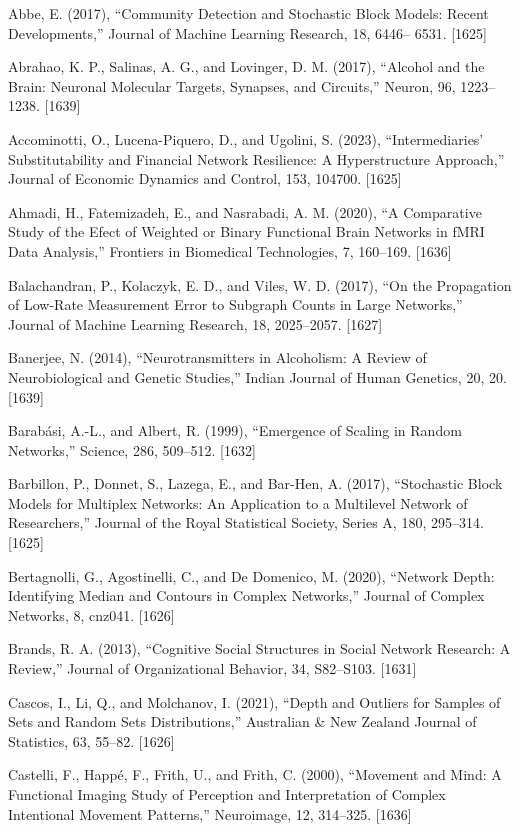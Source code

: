 \documentclass[
  10
]{article}
\begin{document}
Abbe, E. (2017), ``Community Detection and Stochastic Block Models:
Recent Developments,'' Journal of Machine Learning Research, 18, 6446--
6531. {[}1625{]}

Abrahao, K. P., Salinas, A. G., and Lovinger, D. M. (2017), ``Alcohol
and the Brain: Neuronal Molecular Targets, Synapses, and Circuits,''
Neuron, 96, 1223--1238. {[}1639{]}

Accominotti, O., Lucena-Piquero, D., and Ugolini, S. (2023),
``Intermediaries' Substitutability and Financial Network Resilience: A
Hyperstructure Approach,'' Journal of Economic Dynamics and Control,
153, 104700. {[}1625{]}

Ahmadi, H., Fatemizadeh, E., and Nasrabadi, A. M. (2020), ``A
Comparative Study of the Efect of Weighted or Binary Functional Brain
Networks in fMRI Data Analysis,'' Frontiers in Biomedical Technologies,
7, 160--169. {[}1636{]}

Balachandran, P., Kolaczyk, E. D., and Viles, W. D. (2017), ``On the
Propagation of Low-Rate Measurement Error to Subgraph Counts in Large
Networks,'' Journal of Machine Learning Research, 18, 2025--2057.
{[}1627{]}

Banerjee, N. (2014), ``Neurotransmitters in Alcoholism: A Review of
Neurobiological and Genetic Studies,'' Indian Journal of Human Genetics,
20, 20. {[}1639{]}

Barabási, A.-L., and Albert, R. (1999), ``Emergence of Scaling in Random
Networks,'' Science, 286, 509--512. {[}1632{]}

Barbillon, P., Donnet, S., Lazega, E., and Bar-Hen, A. (2017),
``Stochastic Block Models for Multiplex Networks: An Application to a
Multilevel Network of Researchers,'' Journal of the Royal Statistical
Society, Series A, 180, 295--314. {[}1625{]}

Bertagnolli, G., Agostinelli, C., and De Domenico, M. (2020), ``Network
Depth: Identifying Median and Contours in Complex Networks,'' Journal of
Complex Networks, 8, cnz041. {[}1626{]}

Brands, R. A. (2013), ``Cognitive Social Structures in Social Network
Research: A Review,'' Journal of Organizational Behavior, 34, S82--S103.
{[}1631{]}

Cascos, I., Li, Q., and Molchanov, I. (2021), ``Depth and Outliers for
Samples of Sets and Random Sets Distributions,'' Australian \& New
Zealand Journal of Statistics, 63, 55--82. {[}1626{]}

Castelli, F., Happé, F., Frith, U., and Frith, C. (2000), ``Movement and
Mind: A Functional Imaging Study of Perception and Interpretation of
Complex Intentional Movement Patterns,'' Neuroimage, 12, 314--325.
{[}1636{]}
\end{document}
